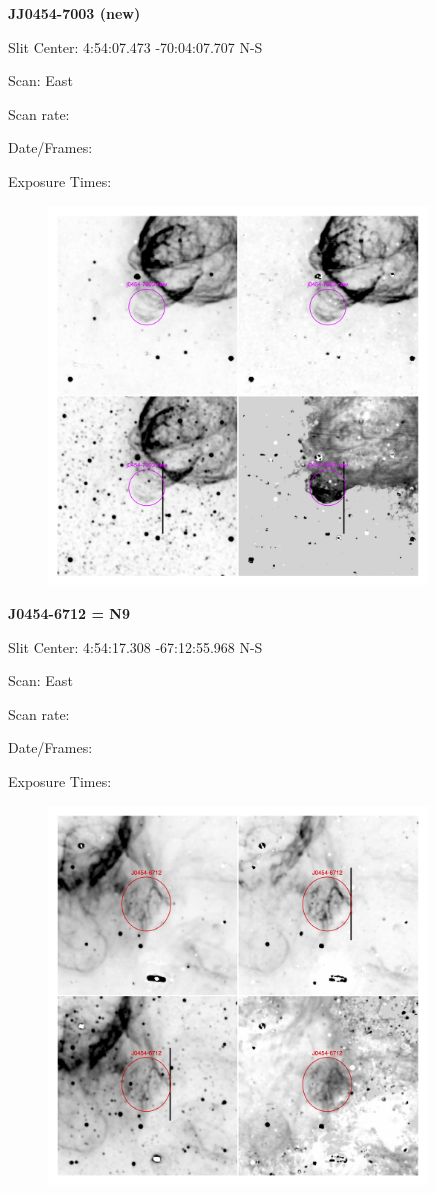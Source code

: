\documentclass[11pt]{article}
\begin{document}
\newpage
{\bf JJ0454-7003 (new)}

Slit Center:   4:54:07.473      -70:04:07.707     N-S

Scan:  East

Scan rate:  

Date/Frames:

Exposure Times:  

\begin{figure}
\includegraphics[width=10.05cm]{snapshots/J0454-7003.png}
\end{figure}

\newpage
{\bf J0454-6712 = N9}

Slit Center:   4:54:17.308    -67:12:55.968     N-S

Scan:  East

Scan rate:  

Date/Frames:

Exposure Times:  

\begin{figure}
\includegraphics[width=10.05cm]{snapshots/J0454-6712.png}
\end{figure}
\end{document}
